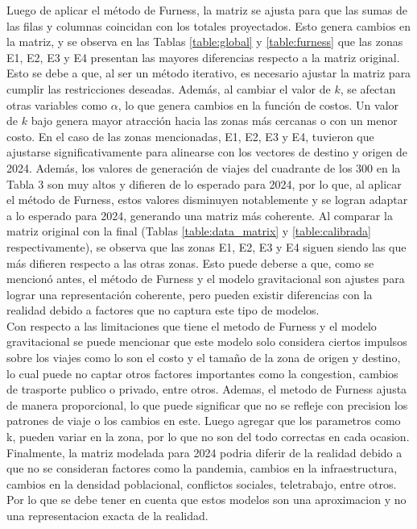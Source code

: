 \documentclass[letterpaper,12pt]{article}
\begin{document}
Luego de aplicar el método de Furness, la matriz se ajusta para que las sumas de las filas y columnas coincidan con los totales proyectados. Esto genera cambios en la matriz, y se observa en las Tablas \ref{table:global} y \ref{table:furness} que las zonas E1, E2, E3 y E4 presentan las mayores diferencias respecto a la matriz original. Esto se debe a que, al ser un método iterativo, es necesario ajustar la matriz para cumplir las restricciones deseadas. Además, al cambiar el valor de $k$, se afectan otras variables como $\alpha$, lo que genera cambios en la función de costos. Un valor de $k$ bajo genera mayor atracción hacia las zonas más cercanas o con un menor costo. En el caso de las zonas mencionadas, E1, E2, E3 y E4, tuvieron que ajustarse significativamente para alinearse con los vectores de destino y origen de 2024. Además, los valores de generación de viajes del cuadrante de los 300 en la Tabla 3 son muy altos y difieren de lo esperado para 2024, por lo que, al aplicar el método de Furness, estos valores disminuyen notablemente y se logran adaptar a lo esperado para 2024, generando una matriz más coherente. Al comparar la matriz original con la final (Tablas \ref{table:data_matrix} y \ref{table:calibrada} respectivamente), se observa que las zonas E1, E2, E3 y E4 siguen siendo las que más difieren respecto a las otras zonas. Esto puede deberse a que, como se mencionó antes, el método de Furness y el modelo gravitacional son ajustes para lograr una representación coherente, pero pueden existir diferencias con la realidad debido a factores que no captura este tipo de modelos.\\

Con respecto a las limitaciones que tiene el metodo de Furness y el modelo gravitacional se puede mencionar que este modelo solo considera ciertos impulsos sobre los viajes como lo son el costo y el tamaño de la zona de origen y destino, lo cual puede no captar otros factores importantes como la congestion, cambios de trasporte publico o privado, entre otros. Ademas, el metodo de Furness ajusta de manera proporcional, lo que puede significar que no se refleje con precision los patrones de viaje o los cambios en este. Luego agregar que los parametros como k, pueden variar en la zona, por lo que no son del todo correctas en cada ocasion. \\

Finalmente, la matriz modelada para 2024 podria diferir de la realidad debido a que no se consideran factores como la pandemia, cambios en la infraestructura, cambios en la densidad poblacional, conflictos sociales, teletrabajo, entre otros. Por lo que se debe tener en cuenta que estos modelos son una aproximacion y no una representacion exacta de la realidad.
\end{document}
